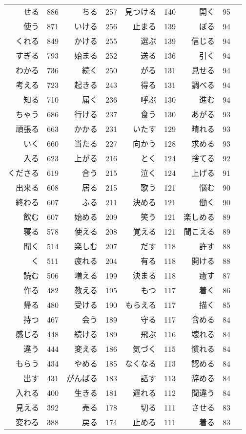 \begin{longtable}{rrrrrrrrr}
せる & 886 & ちる & 257 & 見つける & 140 & 開く & 95 \\
使う & 871 & いける & 256 & 止まる & 139 & ぼる & 94 \\
くれる & 849 & かける & 255 & 選ぶ & 139 & 信じる & 94 \\
すぎる & 793 & 始まる & 252 & 送る & 136 & 引く & 94 \\
わかる & 736 & 続く & 250 & がる & 131 & 見せる & 94 \\
考える & 723 & 起きる & 243 & 得る & 131 & 調べる & 94 \\
知る & 710 & 届く & 236 & 呼ぶ & 130 & 進む & 94 \\
ちゃう & 686 & 行ける & 237 & 食う & 130 & あがる & 93 \\
頑張る & 663 & かかる & 231 & いたす & 129 & 晴れる & 93 \\
いく & 660 & 当たる & 227 & 向かう & 128 & 求める & 93 \\
入る & 623 & 上がる & 216 & とく & 124 & 捨てる & 92 \\
くださる & 619 & 合う & 215 & 泣く & 124 & 上げる & 91 \\
出来る & 608 & 居る & 215 & 歌う & 121 & 悩む & 90 \\
終わる & 607 & ふる & 211 & 決める & 121 & 働く & 90 \\
飲む & 607 & 始める & 209 & 笑う & 121 & 楽しめる & 89 \\
寝る & 578 & 使える & 208 & 覚える & 121 & 聞こえる & 89 \\
聞く & 514 & 楽しむ & 207 & だす & 118 & 許す & 88 \\
く & 511 & 疲れる & 204 & 有る & 118 & 開ける & 88 \\
読む & 506 & 増える & 199 & 決まる & 118 & 癒す & 87 \\
作る & 482 & 教える & 195 & もつ & 117 & 着く & 86 \\
帰る & 480 & 受ける & 190 & もらえる & 117 & 描く & 85 \\
持つ & 467 & 会う & 189 & 守る & 117 & 含める & 84 \\
感じる & 448 & 続ける & 189 & 飛ぶ & 116 & 壊れる & 84 \\
違う & 444 & 変える & 186 & 気づく & 115 & 慣れる & 84 \\
もらう & 434 & やめる & 185 & なくなる & 113 & 認める & 84 \\
出す & 431 & がんばる & 183 & 話す & 113 & 辞める & 84 \\
入れる & 400 & 生きる & 181 & 遅れる & 112 & 間違う & 84 \\
見える & 392 & 売る & 178 & 切る & 111 & させる & 83 \\
変わる & 388 & 戻る & 174 & 止める & 111 & 着る & 83 \\
\hline
\end{longtable}

